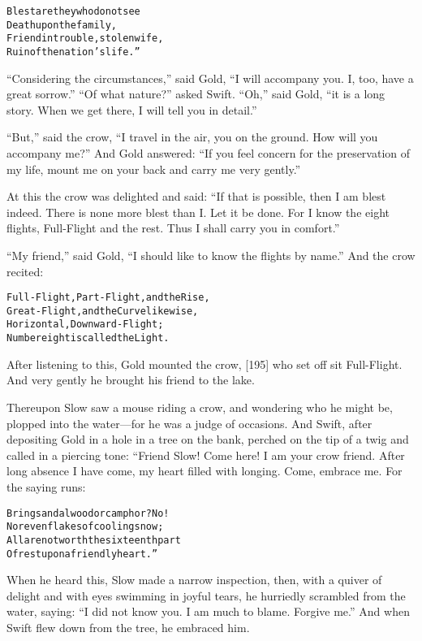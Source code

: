 \documentclass{article}
\renewenvironment{verbatim}{\begin{alltt}\normalfont\begin{centering}}{\end{centering}\end{alltt}}
\begin{document}
\begin{verbatim}
Blest are they who do not see
Death upon the family,
Friend in trouble, stolen wife,
Ruin of the nation's life.”
\end{verbatim}
``Considering the circumstances,'' said Gold,
``I will accompany you. I, too, have a great sorrow.''
``Of what nature?'' asked Swift. ``Oh,'' said Gold,
``it is a long story. When we get there, I will tell you in detail.''

``But,'' said the crow,
``I travel in the air, you on the ground. How will you accompany me?''
And Gold answered:
``If you feel concern for the preservation of my life, mount me on your back and carry me very gently.''

At this the crow was delighted and said:
``If that is possible, then I am blest indeed. There is none more blest than I. Let it be done. For I know the eight flights, Full-Flight and the rest. Thus I shall carry you in comfort.''

``My friend,'' said Gold,
``I should like to know the flights by name.'' And the crow
recited:

\begin{verbatim}
Full-Flight, Part-Flight, and the Rise,
Great-Flight, and the Curve likewise,
Horizontal, Downward-Flight;
Number eight is called the Light.
\end{verbatim}
After listening to this, Gold mounted the crow, [195] who set off
sit Full-Flight. And very gently he brought his friend to the
lake.

Thereupon Slow saw a mouse riding a crow, and wondering who he
might be, plopped into the water---for he was a judge of occasions.
And Swift, after depositing Gold in a hole in a tree on the bank,
perched on the tip of a twig and called in a piercing tone: “Friend
Slow! Come here! I am your crow friend. After long absence I have
come, my heart filled with longing. Come, embrace me. For the
saying runs:

\begin{verbatim}
Bring sandalwood or camphor? No!
Nor even flakes of cooling snow;
All are not worth the sixteenth part
Of rest upon a friendly heart.”
\end{verbatim}
When he heard this, Slow made a narrow inspection, then, with a
quiver of delight and with eyes swimming in joyful tears, he
hurriedly scrambled from the water, saying:
``I did not know you. I am much to blame. Forgive me.'' And when
Swift flew down from the tree, he embraced him.
\end{document}
